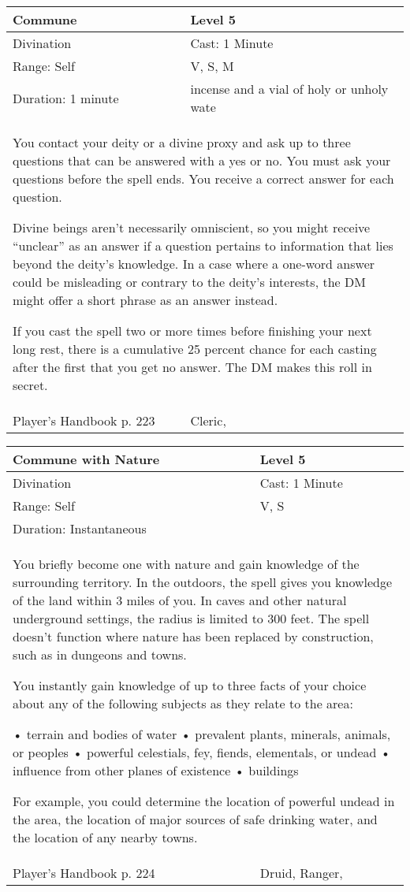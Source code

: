 \documentclass[11pt]{report}
\begin{document}
\begin{table}[H]
	\begin{tabular}{||p{6cm}|p{6cm}||}
		\hline\hline
		\bf{Commune} & Level 5\\ \hline
		Divination & Cast: 1 Minute\\ \hline
		Range: Self & V, S, M\\ \hline
		Duration: 1 minute & incense and a vial of holy or unholy wate\\ \hline
		\multicolumn{2}{||p{12cm}||}{You contact your deity or a divine proxy and ask up to three questions that can be answered with a yes or no. You must ask your questions before the spell ends. You receive a correct answer for each question. 

Divine beings aren’t necessarily omniscient, so you might receive “unclear” as an answer if a question pertains to information that lies beyond the deity’s knowledge. In a case where a one-word answer could be misleading or contrary to the deity’s interests, the DM might offer a short phrase as an answer instead. 

If you cast the spell two or more times before finishing your next long rest, there is a cumulative 25 percent chance for each casting after the first that you get no answer. The DM makes this roll in secret.}\\ \hline
Player's Handbook p. 223 & Cleric, \\ \hline\hline
	\end{tabular}
\end{table}

\begin{table}[H]
	\begin{tabular}{||p{6cm}|p{6cm}||}
		\hline\hline
		\bf{Commune with Nature} & Level 5\\ \hline
		Divination & Cast: 1 Minute\\ \hline
		Range: Self & V, S\\ \hline
		Duration: Instantaneous & \\ \hline
		\multicolumn{2}{||p{12cm}||}{You briefly become one with nature and gain knowledge of the surrounding territory. 
In the outdoors, the spell gives you knowledge of the land within 3 miles of you. In caves and other natural underground settings, the radius is limited to 300 feet. The spell doesn’t function where nature has been replaced by construction, such as in dungeons and towns. 

You instantly gain knowledge of up to three facts of your choice about any of the following subjects as they relate to the area: 

•  terrain and bodies of water 
•  prevalent plants, minerals, animals, or peoples 
•  powerful celestials, fey, fiends, elementals, or undead 
•  influence from other planes of existence 
•  buildings 

For example, you could determine the location of powerful undead in the area, the location of major sources of safe drinking water, and the location of any nearby towns.}\\ \hline
Player's Handbook p. 224 & Druid, Ranger, \\ \hline\hline
	\end{tabular}
\end{table}
\end{document}
